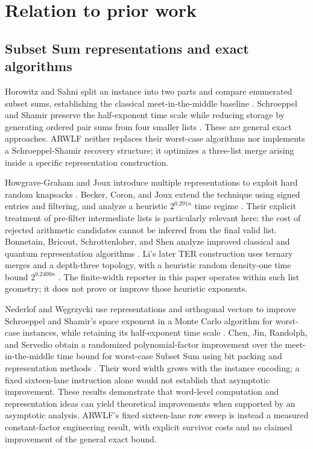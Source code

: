 \documentclass[manuscript,screen,review]{acmart}
\begin{document}
\section{Relation to prior work}
\subsection{Subset Sum representations and exact algorithms}
Horowitz and Sahni split an instance into two parts and compare enumerated subset sums, establishing the classical meet-in-the-middle baseline \cite{hs1974}. Schroeppel and Shamir preserve the half-exponent time scale while reducing storage by generating ordered pair sums from four smaller lists \cite{ss1981}. These are general exact approaches. ARWLF neither replaces their worst-case algorithms nor implements a Schroeppel-Shamir recovery structure; it optimizes a three-list merge arising inside a specific representation construction.

Howgrave-Graham and Joux introduce multiple representations to exploit hard random knapsacks \cite{hgj2010}. Becker, Coron, and Joux extend the technique using signed entries and filtering, and analyze a heuristic $2^{0.291n}$ time regime \cite{bcj2011}. Their explicit treatment of pre-filter intermediate lists is particularly relevant here: the cost of rejected arithmetic candidates cannot be inferred from the final valid list. Bonnetain, Bricout, Schrottenloher, and Shen analyze improved classical and quantum representation algorithms \cite{bbss2020}. Li's later TER construction uses ternary merges and a depth-three topology, with a heuristic random density-one time bound $2^{0.2400n}$ \cite{li2025}. The finite-width reporter in this paper operates within such list geometry; it does not prove or improve those heuristic exponents.

Nederlof and Węgrzycki use representations and orthogonal vectors to improve Schroeppel and Shamir's space exponent in a Monte Carlo algorithm for worst-case instances, while retaining its half-exponent time scale \cite{nw2021}. Chen, Jin, Randolph, and Servedio obtain a randomized polynomial-factor improvement over the meet-in-the-middle time bound for worst-case Subset Sum using bit packing and representation methods \cite{cjrs2023}. Their word width grows with the instance encoding; a fixed sixteen-lane instruction alone would not establish that asymptotic improvement. These results demonstrate that word-level computation and representation ideas can yield theoretical improvements when supported by an asymptotic analysis. ARWLF's fixed sixteen-lane row sweep is instead a measured constant-factor engineering result, with explicit survivor costs and no claimed improvement of the general exact bound.
\end{document}
